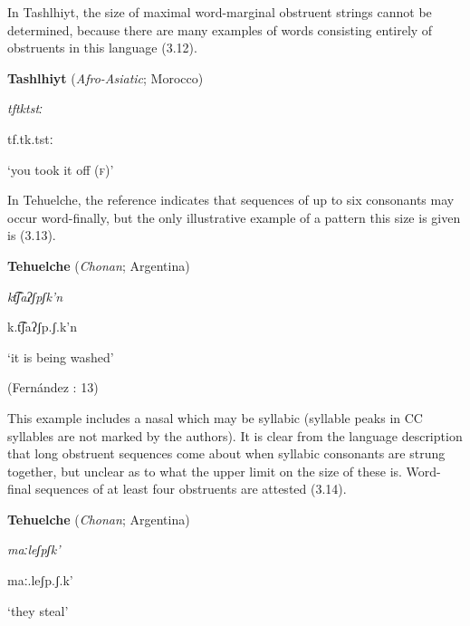   In Tashlhiyt, the size of maximal word-marginal obstruent strings cannot be determined, because there are many examples of words consisting entirely of obstruents in this language (3.12). 



\ea\label{ex:(3.12)}
  \textbf{Tashlhiyt} (\textit{Afro-Asiatic}; Morocco)



\textit{tftktstː}



tf.tk.tstː



‘you took it off (\textsc{f})’



\citep[332]{Ridouane2008}

\z


In Tehuelche, the reference indicates that sequences of up to six consonants may occur word-finally, but the only illustrative example of a pattern this size is given is (3.13).



\ea\label{ex:(3.13)}
   \textbf{Tehuelche} (\textit{Chonan}; Argentina)



\textit{kt͡ʃaʔʃpʃk’n}



k.t͡ʃaʔʃp.ʃ.k’n



‘it is being washed’



(Fernández \citealt{GarayHernández2006}: 13)
\z



This example includes a nasal which may be syllabic (syllable peaks in CC syllables are not marked by the authors). It is clear from the language description that long obstruent sequences come about when syllabic consonants are strung together, but unclear as to what the upper limit on the size of these is. Word-final sequences of at least four obstruents are attested (3.14).



\ea\label{ex:(3.14)}
   \textbf{Tehuelche} (\textit{Chonan}; Argentina)



\textit{maːleʃpʃk’}



maː.leʃp.ʃ.k’



‘they steal’



